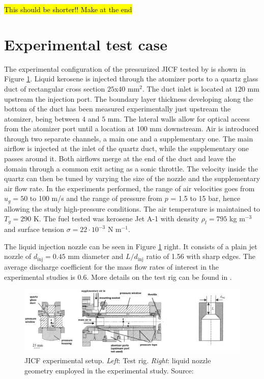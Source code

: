 \hl{This should be shorter!! Make at the end}

\section{Experimental test case}
	\label{sec:ch5_experimental_bench}

The experimental configuration of the pressurized JICF tested by  is shown in Figure \ref{fig:experiment_JICF_DLR}. Liquid kerosene is injected through the atomizer ports to a quartz glass duct of rectangular cross section $25$x$40$ mm$^2$. The duct inlet is located at $120$ mm upstream the injection port. The boundary layer thickness developing along the bottom of the duct has been measured experimentally just upstream the atomizer, being between $4$ and $5$ mm. The lateral walls allow for optical access from the atomizer port until a location at 100 mm downstream. Air is introduced through two separate channels, a main one and a supplementary one. The main airflow is injected at the inlet of the quartz duct, while the supplementary one passes around it. Both airflows merge at the end of the duct and leave the domain through a common exit acting as a sonic throttle. The velocity inside the quartz can then be tuned by varying the size of the nozzle and the supplementary air flow rate. In the experiments performed, the range of air velocities goes from $u_g = 50$ to 100 m/s and the range of pressure from $p$ = 1.5 to 15 bar, hence allowing the study high-pressure conditions. The air temperature is maintained to $T_g = 290$ K. The fuel tested was kerosene Jet A-1 with density $\rho_l = 795$ kg m$^{-3}$ and surface tension $\sigma = 22 \cdot 10^{-3}$ N m$^{-1}$.

The liquid injection nozzle can be seen in Figure \ref{fig:experiment_JICF_DLR} right. It consists of a plain jet nozzle of $d_\mathrm{inj} =  0.45$ mm diameter and $L/d_\mathrm{inj}$ ratio of 1.56 with sharp edges. The average discharge coefficient for the mass flow rates of interest in the experimental studies is $0.6$. More details on the test rig can be found in .

\clearpage

\begin{figure}[h!]
	\centering
	\includegraphics[scale=0.35]{./part2_developments/figures_ch5_resolved_JICF/experiment_JICF_DLR}
	\caption[JICF experimental setup]{JICF experimental setup. \textsl{Left}: Test rig. \textsl{Right}: liquid nozzle geometry employed in the experimental study. Source: }
	\label{fig:experiment_JICF_DLR}
\end{figure}




